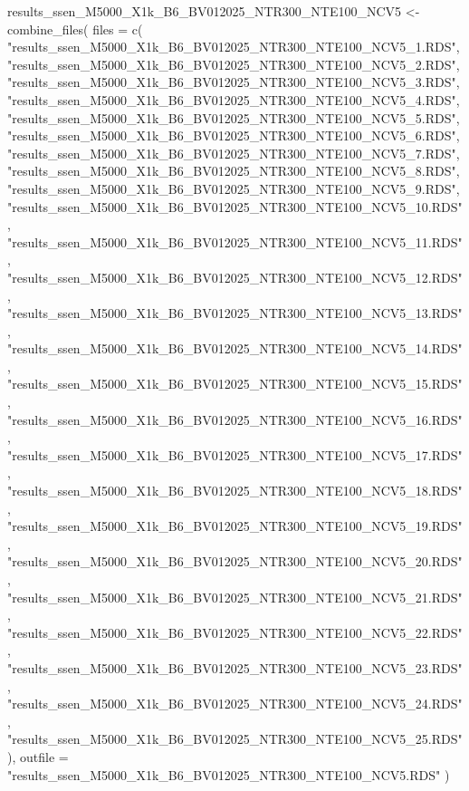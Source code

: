 \documentclass[
]{article}
\newenvironment{Shaded}{\begin{snugshade}}{\end{snugshade}}
\newcommand{\AttributeTok}[1]{\textcolor[rgb]{0.77,0.63,0.00}{#1}}
\newcommand{\FunctionTok}[1]{\textcolor[rgb]{0.00,0.00,0.00}{#1}}
\newcommand{\NormalTok}[1]{#1}
\newcommand{\OtherTok}[1]{\textcolor[rgb]{0.56,0.35,0.01}{#1}}
\newcommand{\StringTok}[1]{\textcolor[rgb]{0.31,0.60,0.02}{#1}}
\begin{document}
\begin{Shaded}
\begin{Highlighting}[]
\NormalTok{results\_ssen\_M5000\_X1k\_B6\_BV012025\_NTR300\_NTE100\_NCV5 }\OtherTok{\textless{}{-}} \FunctionTok{combine\_files}\NormalTok{(}
  \AttributeTok{files =} \FunctionTok{c}\NormalTok{(}
    \StringTok{"results\_ssen\_M5000\_X1k\_B6\_BV012025\_NTR300\_NTE100\_NCV5\_1.RDS"}\NormalTok{,}
    \StringTok{"results\_ssen\_M5000\_X1k\_B6\_BV012025\_NTR300\_NTE100\_NCV5\_2.RDS"}\NormalTok{,}
    \StringTok{"results\_ssen\_M5000\_X1k\_B6\_BV012025\_NTR300\_NTE100\_NCV5\_3.RDS"}\NormalTok{,}
    \StringTok{"results\_ssen\_M5000\_X1k\_B6\_BV012025\_NTR300\_NTE100\_NCV5\_4.RDS"}\NormalTok{,}
    \StringTok{"results\_ssen\_M5000\_X1k\_B6\_BV012025\_NTR300\_NTE100\_NCV5\_5.RDS"}\NormalTok{,}
    \StringTok{"results\_ssen\_M5000\_X1k\_B6\_BV012025\_NTR300\_NTE100\_NCV5\_6.RDS"}\NormalTok{,}
    \StringTok{"results\_ssen\_M5000\_X1k\_B6\_BV012025\_NTR300\_NTE100\_NCV5\_7.RDS"}\NormalTok{,}
    \StringTok{"results\_ssen\_M5000\_X1k\_B6\_BV012025\_NTR300\_NTE100\_NCV5\_8.RDS"}\NormalTok{,}
    \StringTok{"results\_ssen\_M5000\_X1k\_B6\_BV012025\_NTR300\_NTE100\_NCV5\_9.RDS"}\NormalTok{,}
    \StringTok{"results\_ssen\_M5000\_X1k\_B6\_BV012025\_NTR300\_NTE100\_NCV5\_10.RDS"}\NormalTok{,}
    \StringTok{"results\_ssen\_M5000\_X1k\_B6\_BV012025\_NTR300\_NTE100\_NCV5\_11.RDS"}\NormalTok{,}
    \StringTok{"results\_ssen\_M5000\_X1k\_B6\_BV012025\_NTR300\_NTE100\_NCV5\_12.RDS"}\NormalTok{,}
    \StringTok{"results\_ssen\_M5000\_X1k\_B6\_BV012025\_NTR300\_NTE100\_NCV5\_13.RDS"}\NormalTok{,}
    \StringTok{"results\_ssen\_M5000\_X1k\_B6\_BV012025\_NTR300\_NTE100\_NCV5\_14.RDS"}\NormalTok{,}
    \StringTok{"results\_ssen\_M5000\_X1k\_B6\_BV012025\_NTR300\_NTE100\_NCV5\_15.RDS"}\NormalTok{,}
    \StringTok{"results\_ssen\_M5000\_X1k\_B6\_BV012025\_NTR300\_NTE100\_NCV5\_16.RDS"}\NormalTok{,}
    \StringTok{"results\_ssen\_M5000\_X1k\_B6\_BV012025\_NTR300\_NTE100\_NCV5\_17.RDS"}\NormalTok{,}
    \StringTok{"results\_ssen\_M5000\_X1k\_B6\_BV012025\_NTR300\_NTE100\_NCV5\_18.RDS"}\NormalTok{,}
    \StringTok{"results\_ssen\_M5000\_X1k\_B6\_BV012025\_NTR300\_NTE100\_NCV5\_19.RDS"}\NormalTok{,}
    \StringTok{"results\_ssen\_M5000\_X1k\_B6\_BV012025\_NTR300\_NTE100\_NCV5\_20.RDS"}\NormalTok{,}
    \StringTok{"results\_ssen\_M5000\_X1k\_B6\_BV012025\_NTR300\_NTE100\_NCV5\_21.RDS"}\NormalTok{,}
    \StringTok{"results\_ssen\_M5000\_X1k\_B6\_BV012025\_NTR300\_NTE100\_NCV5\_22.RDS"}\NormalTok{,}
    \StringTok{"results\_ssen\_M5000\_X1k\_B6\_BV012025\_NTR300\_NTE100\_NCV5\_23.RDS"}\NormalTok{,}
    \StringTok{"results\_ssen\_M5000\_X1k\_B6\_BV012025\_NTR300\_NTE100\_NCV5\_24.RDS"}\NormalTok{,}
    \StringTok{"results\_ssen\_M5000\_X1k\_B6\_BV012025\_NTR300\_NTE100\_NCV5\_25.RDS"}
\NormalTok{  ),}
  \AttributeTok{outfile =} \StringTok{"results\_ssen\_M5000\_X1k\_B6\_BV012025\_NTR300\_NTE100\_NCV5.RDS"}
\NormalTok{)}
\end{Highlighting}
\end{Shaded}
\end{document}
